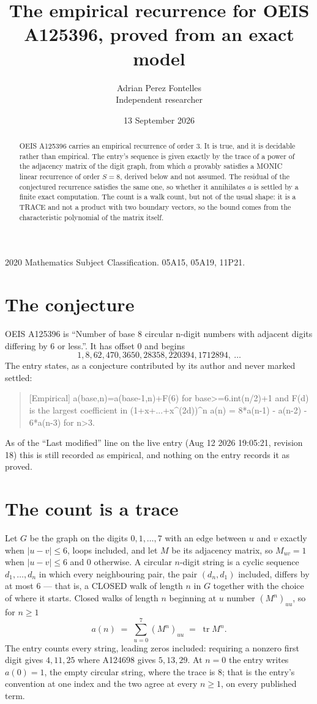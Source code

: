 \documentclass[11pt,a4paper]{article}
\title{The empirical recurrence for OEIS A125396, proved from an exact model}
\author{Adrian Perez Fontelles\\ \small Independent researcher}
\date{13 September 2026}
\theoremstyle{plain}
\theoremstyle{definition}
\begin{document}
\maketitle

\begin{abstract}
OEIS A125396 carries an empirical recurrence of order $3$. It is true, and it is
decidable rather than empirical. The entry's sequence is given exactly by the trace of a power of the adjacency matrix of the digit graph, from
which $a$ provably satisfies a MONIC linear recurrence of order $S=8$, derived below and not
assumed. The residual of the conjectured recurrence satisfies the same one, so whether it
annihilates $a$ is settled by a finite exact computation. The count is a walk count, but not of the usual shape: it is a TRACE and not a product with two boundary vectors, so the bound comes from the characteristic polynomial of the matrix itself.
\end{abstract}

\noindent\small 2020 Mathematics Subject Classification. 05A15, 05A19, 11P21.\normalsize

\section{The conjecture}

OEIS A125396 is ``Number of base 8 circular n-digit numbers with adjacent digits differing by 6 or less.''. It has offset $0$ and begins
\[
1, 8, 62, 470, 3650, 28358, 220394, 1712894,\ \dots
\]
The entry states, as a conjecture contributed by its author and never marked settled:
\begin{quote}
[Empirical] a(base,n)=a(base-1,n)+F(6) for base>=6.int(n/2)+1 and F(d) is the largest coefficient in (1+x+...+x\^{}(2d))\^{}n a(n) = 8*a(n-1) - a(n-2) - 6*a(n-3) for n>3.
\end{quote}
As of the ``Last modified'' line on the live entry (Aug 12 2026 19:05:21, revision 18)
this is still recorded as empirical, and nothing on the entry records it as proved.

\section{The count is a trace}

Let $G$ be the graph on the digits $0,1,\dots,7$ with an edge between $u$ and $v$ exactly
when $|u-v|\le6$, loops included, and let $M$ be its adjacency matrix, so $M_{uv}=1$ when
$|u-v|\le6$ and $0$ otherwise. A circular $n$-digit string is a cyclic sequence
$d_1,\dots,d_n$ in which every neighbouring pair, the pair $(d_n,d_1)$ included, differs by at
most $6$ --- that is, a CLOSED walk of length $n$ in $G$ together with the choice of where it
starts. Closed walks of length $n$ beginning at $u$ number $(M^n)_{uu}$, so for $n\ge1$
\[
a(n)\;=\;\sum_{u=0}^{7}(M^{n})_{uu}\;=\;\operatorname{tr}M^{n} .
\]
The entry counts every string, leading zeros included: requiring a nonzero first digit gives
$4,11,25$ where A124698 gives $5,13,29$. At $n=0$ the entry writes $a(0)=1$, the empty circular
string, where the trace is $8$; that is the entry's convention at one index and the two agree
at every $n\ge1$, on every published term.
\end{document}
